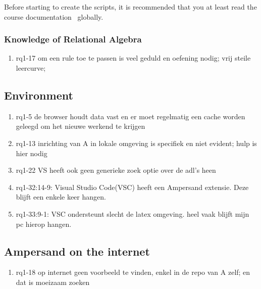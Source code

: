 Before starting to create the scripts, it is recommended that you at least read the course documentation~ globally.



\subsubsection{Knowledge of Relational Algebra}
\begin{comment}
plaats hier de afgehandelde items.
\end{comment}

\begin{enumerate}
    \item rq1-17 om een rule toe te passen is veel geduld en oefening nodig; vrij steile leercurve; 
\end{enumerate}

\subsection{Environment}
\begin{comment}
plaats hier de afgehandelde items.
\end{comment}
\begin{enumerate}
    \item rq1-5 de browser houdt data vast en er moet regelmatig een cache worden geleegd om het nieuwe werkend te krijgen
    \item rq1-13 inrichting van A in lokale omgeving is specifiek en niet evident; hulp is hier nodig    
    \item rq1-22 VS heeft ook geen generieke zoek optie over de adl's heen
    \item rq1-32:14-9: Visual Studio Code(VSC) heeft een Ampersand extensie. Deze blijft een enkele keer hangen.
    \item rq1-33:9-1: VSC ondersteunt slecht de latex omgeving. heel vaak blijft mijn pc hierop hangen.  

\end{enumerate}

\subsection{Ampersand on the internet}
\begin{comment}
plaats hier de afgehandelde items.
\end{comment}
\begin{enumerate}
    \item rq1-18 op internet geen voorbeeld te vinden, enkel in de repo van A zelf; en dat is moeizaam zoeken    
\end{enumerate}

